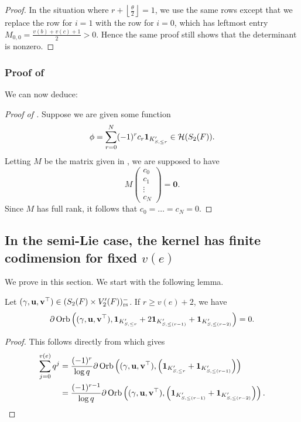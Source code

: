 \begin{proof}
  In the situation where $r + \left\lfloor \frac{\theta}{2} \right\rfloor = 1$,
  we use the same rows except that we replace the row for $i=1$
  with the row for $i=0$, which has leftmost entry $M_{0,0} = \frac{v(b)+v(c)+1}{2} > 0$.
  Hence the same proof still shows that the determinant is nonzero.
\end{proof}

\subsubsection{Proof of }
We can now deduce:

\semiliekertriv*

\begin{proof}[Proof of ]
Suppose we are given some function
\[ \phi = \sum_{r=0}^N (-1)^r c_r \mathbf{1}_{K'_{S, \le r}} \in \mathcal H(S_2(F)). \]
Letting $M$ be the matrix given in ,
we are supposed to have
\[ M \begin{pmatrix} c_0 \\ c_1 \\ \vdots \\ c_N \end{pmatrix} = \mathbf{0}. \]
Since $M$ has full rank, it follows that $c_0 = \dots = c_N = 0$.
\end{proof}

\subsection{In the semi-Lie case, the kernel has finite codimension for fixed $v(e)$}
We prove  in this section.
We start with the following lemma.
\begin{lemma}
  \label{lem:semi_lie_large_r}
  Let ${(\gamma, \mathbf u, \mathbf v^\top)} \in (S_2(F) \times V'_2(F))_{\mathrm{rs}}^-$. If $r \ge v(e) + 2$, we have
  \[
    \partial \operatorname{Orb} \left( {(\gamma, \mathbf u, \mathbf v^\top)},
        \mathbf{1}_{K'_{S, \le r}} + 2 \mathbf{1}_{K'_{S, \le (r-1)}} + \mathbf{1}_{K'_{S, \le (r-2)}}
      \right) = 0.
  \]
\end{lemma}
\begin{proof}
  This follows directly from  which gives
  \begin{align*}
    \sum_{j=0}^{v(e)} q^j
    &= \frac{(-1)^r}{\log q} \partial
    \operatorname{Orb} \left( {(\gamma, \mathbf u, \mathbf v^\top)},
      \left(\mathbf{1}_{K'_{S, \le r}} + \mathbf{1}_{K'_{S, \le (r-1)}}\right)
      \right) \\
    &= \frac{(-1)^{r-1}}{\log q} \partial
    \operatorname{Orb} \left( {(\gamma, \mathbf u, \mathbf v^\top)},
      \left(\mathbf{1}_{K'_{S, \le (r-1)}} + \mathbf{1}_{K'_{S, \le (r-2)}}\right)
      \right). \qedhere
  \end{align*}
\end{proof}

